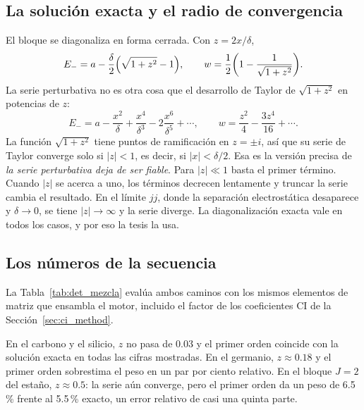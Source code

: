 \documentclass[11pt,a4paper]{article}
\begin{document}
\subsection{La solución exacta y el radio de convergencia}

El bloque se diagonaliza en forma cerrada. Con $z = 2x/\delta$,
\begin{equation}
  E_- = a - \frac{\delta}{2}\qty(\sqrt{1+z^2} - 1), \qquad
  w = \frac{1}{2}\qty(1 - \frac{1}{\sqrt{1+z^2}}).
\end{equation}
La serie perturbativa no es otra cosa que el desarrollo de Taylor de $\sqrt{1+z^2}$ en potencias
de $z$:
\begin{equation}
  E_- = a - \frac{x^2}{\delta} + \frac{x^4}{\delta^3} - 2\frac{x^6}{\delta^5} + \cdots, \qquad
  w = \frac{z^2}{4} - \frac{3z^4}{16} + \cdots .
\end{equation}
La función $\sqrt{1+z^2}$ tiene puntos de ramificación en $z = \pm i$, así que su serie de Taylor
converge solo si $|z| < 1$, es decir, si $|x| < \delta/2$. Esa es la versión precisa de \emph{la
serie perturbativa deja de ser fiable}. Para $|z| \ll 1$ basta el primer término. Cuando $|z|$ se
acerca a uno, los términos decrecen lentamente y truncar la serie cambia el resultado. En el límite
$jj$, donde la separación electrostática desaparece y $\delta \to 0$, se tiene $|z| \to \infty$ y
la serie diverge. La diagonalización exacta vale en todos los casos, y por eso la tesis la usa.

\subsection{Los números de la secuencia}

La Tabla~\ref{tab:det_mezcla} evalúa ambos caminos con los mismos elementos de matriz que
ensambla el motor, incluido el factor de los coeficientes CI de la Sección~\ref{sec:ci_method}.

\begin{table}[htbp]
  \centering\small
  
  \caption{Bloques $J=2$ y $J=0$ con las energías del CI y el $\zeta_{np}$ calculado (cm$^{-1}$).
  $w^{(1)}$ y $E^{(2)}$ son los resultados de primer y segundo orden; $w$ y $E_{\text{exacto}}$, los
  de la diagonalización. El $w$ del bloque $J=2$ es el peso de $^1D_2$ que da la
  Tabla~\ref{tab:lande} para el modelo.}
  \label{tab:det_mezcla}
\end{table}

En el carbono y el silicio, $z$ no pasa de 0.03 y el primer orden coincide con la solución exacta
en todas las cifras mostradas. En el germanio, $z \approx 0.18$ y el primer orden sobrestima el
peso en un par por ciento relativo. En el bloque $J=2$ del estaño, $z \approx 0.5$: la serie aún
converge, pero el primer orden da un peso de 6.5\,\% frente al 5.5\,\% exacto, un error relativo de
casi una quinta parte.
\end{document}
